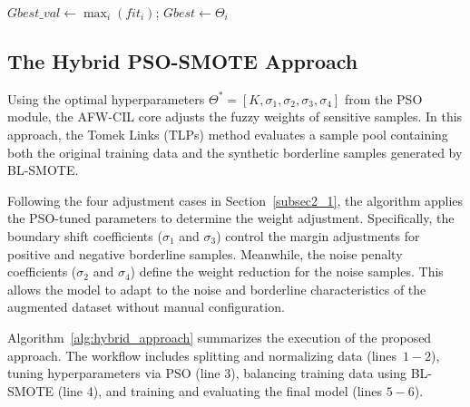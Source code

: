 \documentclass[pdflatex,sn-mathphys-num]{sn-jnl}%
\theoremstyle{thmstyleone}%
\theoremstyle{thmstyletwo}
\theoremstyle{thmstylethree}
\begin{document}
\begin{algorithm}[H]
\small
\caption{PSO Algorithm for AFW-CIL Hyperparameter Tuning}
\label{alg:pso}
$Gbest\_val \leftarrow \max_{i}(fit_i)$; $Gbest \leftarrow \Theta_i$\;
\;
\end{algorithm}


\subsection{The Hybrid PSO-SMOTE Approach}\label{subsec3_2}
Using the optimal hyperparameters $\Theta^* = [K, \sigma_1, \sigma_2, \sigma_3, \sigma_4]$ from the PSO module, the AFW-CIL core adjusts the fuzzy weights of sensitive samples. In this approach, the Tomek Links (TLPs) method evaluates a sample pool containing both the original training data and the synthetic borderline samples generated by BL-SMOTE.

Following the four adjustment cases in Section~\ref{subsec2_1}, the algorithm applies the PSO-tuned parameters to determine the weight adjustment. Specifically, the boundary shift coefficients ($\sigma_1$ and $\sigma_3$) control the margin adjustments for positive and negative borderline samples. Meanwhile, the noise penalty coefficients ($\sigma_2$ and $\sigma_4$) define the weight reduction for the noise samples. This allows the model to adapt to the noise and borderline characteristics of the augmented dataset without manual configuration.

\smallskip
Algorithm~\ref{alg:hybrid_approach} summarizes the execution of the proposed approach. The workflow includes splitting and normalizing data (lines~$1-2$), tuning hyperparameters via PSO (line 3), balancing training data using BL-SMOTE (line 4), and training and evaluating the final model (lines $5-6$).
\end{document}
